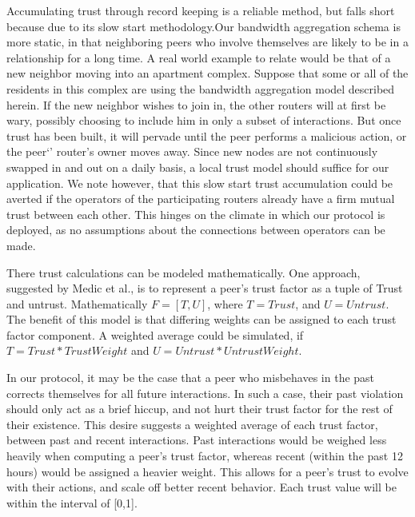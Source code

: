 \documentclass[12pt]{article}
\begin{document}
			Accumulating trust through record keeping is a reliable method, but falls short because due to its slow start methodology\cite{dou2004recommendation}.Our bandwidth aggregation schema is more static, in that neighboring peers who involve themselves are likely to be in a relationship for a long time. A real world example to relate would be that of a new neighbor moving into an apartment complex. Suppose that some or all of the residents in this complex are using the bandwidth aggregation model described herein. If the new neighbor wishes to join in, the other routers will at first be wary, possibly choosing to include him in only a subset of interactions. But once trust has been built, it will pervade until the peer performs a malicious action, or the peer`' router's owner moves away. Since new nodes are not continuously swapped in and out on a daily basis, a local trust model should suffice for our application. We note however, that this slow start trust accumulation could be averted if the operators of the participating routers already have a firm mutual trust between each other. This hinges on the climate in which our protocol is deployed, as no assumptions about the connections between operators can be made.

			There trust calculations can be modeled mathematically. One approach, suggested by Medic et al., is to represent a peer's trust factor as a tuple of Trust and untrust. Mathematically $F = [T,U] $, where $T = Trust$, and $U = Untrust$. The benefit of this model is that differing weights can be assigned to each trust factor component. A weighted average could be simulated, if $T = Trust * Trust Weight$ and $U = Untrust * Untrust Weight$.

			In our protocol, it may be the case that a peer who misbehaves in the past corrects themselves for all future interactions. In such a case, their past violation should only act as a brief hiccup, and not hurt their trust factor for the rest of their existence. This desire suggests a weighted average of each trust factor, between past and recent interactions. Past interactions would be weighed less heavily when computing a peer's trust factor, whereas recent (within the past 12 hours) would be assigned a heavier weight. This allows for a peer's trust to evolve with their actions, and scale off better recent behavior. Each trust value will be within the interval of [0,1].
\end{document}
